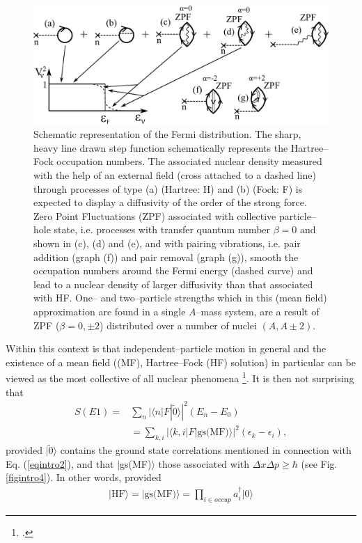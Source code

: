 \begin{figure}
\centerline {
\includegraphics*[width=12cm]{introduccion/figs/fig1_2_2}
}
\caption{Schematic representation of the Fermi distribution. The sharp, heavy line drawn step function schematically represents the Hartree--Fock occupation numbers. The associated nuclear density measured with the help of an external field (cross attached to a dashed line) through processes of type (a) (Hartree: H) and (b) (Fock: F) is expected to display a diffusivity of the order of the strong force. Zero Point Fluctuations (ZPF) associated with collective particle--hole state, i.e. processes with transfer quantum number $\beta=0$ and shown in (c), (d) and (e), and with pairing vibrations, i.e. pair addition (graph (f)) and pair removal (graph (g)), smooth the occupation numbers around the Fermi energy (dashed curve) and lead to a nuclear density of larger diffusivity than that associated with HF. One-- and two--particle strengths which in this (mean field) approximation are found in a single $A$--mass system, are a result of ZPF ($\beta=0,\pm 2$) distributed over a number of nuclei $(A, A\pm 2)$.}
\label{fig1.2.2}
\end{figure}
Within this context is that independent--particle motion in general and the existence of a mean field ((MF), Hartree--Fock (HF) solution) in particular can be viewed as the most collective of all nuclear phenomena \footnote{\cite{Mottelson:62}.}. It is then not surprising that 
\begin{align}\label{eqintro6}
\nonumber S(E1)=&\sum_n |\langle n|F|\tilde 0\rangle|^2(E_n-E_0)\\
&=\sum_{k,i}|\langle k,i|F|\text{gs(MF)}\rangle|^2(\epsilon_{k}-\epsilon_i),
\end{align}
provided $|\tilde 0\rangle$ contains the ground state correlations mentioned in connection with Eq. (\ref{eqintro2}), and that $|$gs(MF)$\rangle$ those associated with $\Delta x\Delta p\geq \hbar$ (see Fig. \ref{figintro4}). In other words, provided
\begin{align}
|\text{HF}\rangle=|\text{gs(MF)}\rangle=\prod_{i\in occup}a^\dagger_i |0\rangle
\end{align}
